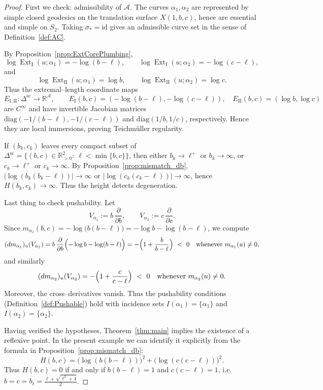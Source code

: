 \documentclass[10pt,a4paper]{amsart}
\DeclareMathOperator{\Ext}{Ext}
\newcommand{\R}{\mathbb{R}}
\newcommand{\id}{\mathrm{id}}
\begin{document}
\begin{proof}
First we check: admissibility of \(\mathcal A_{}\).
The curves \(\alpha_1,\alpha_2\) are represented by simple closed geodesics on the translation surface
\(X(1,b,c)\), hence are essential and simple on \(S_2\).  Taking \(\sigma_\ast=\id\) gives an admissible curve
set in the sense of Definition~\ref{def:AC}.

\smallskip
\noindent

By Proposition~\ref{prop:ExtCorePlumbing},
\[
\log \Ext_{\mathrm{I}}(u;\alpha_1)=-\log(b-\ell),\qquad \log \Ext_{\mathrm{I}}(u;\alpha_2)=-\log(c-\ell),
\]
and
\[
\log \Ext_{\mathrm{II}}(u;\alpha_1)=\log b,\qquad \log \Ext_{\mathrm{II}}(u;\alpha_2)=\log c.
\]
Thus the extremal--length coordinate maps
\[
E_{\mathrm{I, II}}:\Delta^{\mathrm{sc}}_{}\longrightarrow \R^{\mathcal A_{}},
\qquad
E_{\mathrm{I}}(b,c)=(-\log(b-\ell),-\log(c-\ell)),\quad
E_{\mathrm{II}}(b,c)=(\log b,\log c)
\]
are \(C^\infty\) and have invertible Jacobian matrices \(\mathrm{diag}(-1/(b-\ell),-1/(c-\ell))\) and
\(\mathrm{diag}(1/b,1/c)\), respectively.
Hence they are local immersions, proving Teichm\"uller regularity.


\smallskip
\noindent

If \((b_k,c_k)\) leaves every compact subset of \(\Delta^{\mathrm{sc}}_{}=\{(b,c)\in\R_{>0}^2:\ \ell<\min\{b,c\}\}\),
then either \(b_k\longrightarrow \ell^+\) or \(b_k\longrightarrow\infty\), or \(c_k\longrightarrow \ell^+\) or \(c_k\longrightarrow\infty\).
By Proposition~\ref{prop:mismatch_db}, \(\bigl|\log(b_k(b_k-\ell))\bigr|\longrightarrow\infty\) or \(\bigl|\log(c_k(c_k-\ell))\bigr|\longrightarrow\infty\),
hence \(H(b_k,c_k)\longrightarrow\infty\).  Thus the height detects degeneration.

\smallskip
\noindent
Last thing to check pushability. Let
\[
V_{\alpha_1}:=b\,\frac{\partial}{\partial b},
\qquad
V_{\alpha_2}:=c\,\frac{\partial}{\partial c}.
\]
Since \(m_{\alpha_1}(b,c)=-\log\bigl(b(b-\ell)\bigr)=-\log b-\log(b-\ell)\), we compute
\[
(dm_{\alpha_1})_u(V_{\alpha_1})=b\,\frac{\partial}{\partial b}\Bigl(-\log b-\log(b-\ell)\Bigr)
= -\Bigl(1+\frac{b}{b-\ell}\Bigr)\ <\ 0
\quad\text{whenever }m_{\alpha_1}(u)\neq 0,
\]
and similarly
\[
(dm_{\alpha_2})_u(V_{\alpha_2})=
 -\Bigl(1+\frac{c}{c-\ell}\Bigr)\ <\ 0
\quad\text{whenever }m_{\alpha_2}(u)\neq 0.
\]
Moreover, the cross--derivatives vanish.  Thus the pushability conditions
(Definition~\ref{def:Pushable}) hold with incidence sets \(I(\alpha_1)=\{\alpha_1\}\) and \(I(\alpha_2)=\{\alpha_2\}\).

\smallskip
Having verified the hypotheses, Theorem~\ref{thm:main} implies the existence of a reflexive point.
In the present example we can identify it explicitly from the formula in Proposition~\ref{prop:mismatch_db}:
\[
H(b,c)=\bigl(\log(b(b-\ell))\bigr)^2+\bigl(\log(c(c-\ell))\bigr)^2.
\]
Thus \(H(b,c)=0\) if and only if \(b(b-\ell)=1\) and \(c(c-\ell)=1\), i.e.\ \(b=c=b_\ell=\frac{\ell+\sqrt{\ell^2+4}}{2}\).
\end{proof}
\end{document}
